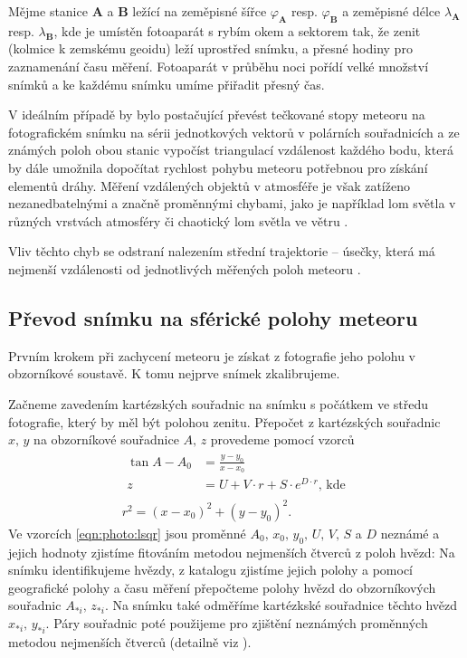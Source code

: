 \medskip

Mějme stanice \textbf{A} a \textbf{B} ležící na zeměpisné šířce $\varphi_\mathbf{A}$ resp. $\varphi_\mathbf{B}$ a zeměpisné délce $\lambda_\mathbf{A}$ resp. $\lambda_\mathbf{B}$, kde je umístěn fotoaparát s rybím okem a sektorem tak, že zenit (kolmice k zemskému geoidu) leží uprostřed snímku, a přesné hodiny pro zaznamenání času měření. Fotoaparát v průběhu noci pořídí velké množství snímků a ke každému snímku umíme přiřadit přesný čas.

\smallskip

V ideálním případě by bylo postačující převést tečkované stopy meteoru na fotografickém snímku na sérii jednotkových vektorů v polárních souřadnicích a ze známých poloh obou stanic vypočíst triangulací vzdálenost každého bodu, která by dále umožnila dopočítat rychlost pohybu meteoru potřebnou pro získání elementů dráhy. Měření vzdálených objektů v atmosféře je však zatíženo nezanedbatelnými a značně proměnnými chybami, jako je například lom světla v různých vrstvách atmosféry či chaotický lom světla ve větru \cite{radiosurvey}.

Vliv těchto chyb se odstraní nalezením střední trajektorie -- úsečky, která má nejmenší vzdálenosti od jednotlivých měřených poloh meteoru \cite{ceplecha}.

\subsection{Převod snímku na sférické polohy meteoru}%
Prvním krokem při zachycení meteoru je získat z fotografie jeho polohu v obzorníkové soustavě. K tomu nejprve snímek zkalibrujeme.

Začneme zavedením kartézských souřadnic na snímku s počátkem ve středu fotografie, který by měl být polohou zenitu. Přepočet z kartézských souřadnic $x,\,y$ na obzorníkové souřadnice $A,\,z$ provedeme pomocí vzorců \cite{ceplecha}
\begin{eqnarray}
    \begin{aligned}
        \tan{A-A_0} & =\frac{y-y_0}{x-x_0}                        \\
        z           & =U+V\cdot r+S\cdot e^{D\cdot r}\text{, kde}
    \end{aligned}\label{eqn:photo:lsqr}\\
    r^2=(x-x_0)^2+(y-y_0)^2\text{.}
\end{eqnarray}
Ve vzorcích \eqref{eqn:photo:lsqr} jsou proměnné $A_0,\,x_0,\,y_0,\,U,\,V,\,S$ a $D$ neznámé a jejich hodnoty zjistíme fitováním metodou nejmenších čtverců z poloh hvězd: Na snímku identifikujeme hvězdy, z katalogu zjistíme jejich polohy a pomocí geografické polohy a času měření přepočteme polohy hvězd do obzorníkových souřadnic $A_{\ast i},\,z_{\ast i}$. Na snímku také odměříme kartézkské souřadnice těchto hvězd $x_{\ast i},\,y_{\ast i}$. Páry souřadnic poté použijeme pro zjištění neznámých proměnných metodou nejmenších čtverců (detailně viz \cite[223--224]{ceplecha}).

